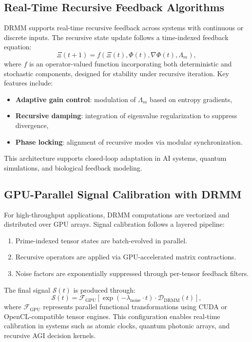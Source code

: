 \documentclass{article}
\theoremstyle{plain}
\begin{document}
\subsection{Real-Time Recursive Feedback Algorithms}

DRMM supports real-time recursive feedback across systems with continuous or discrete inputs. The recursive state update follows a time-indexed feedback equation:
\begin{equation}
\Xi(t+1) = f\left(\Xi(t), \Phi(t), \nabla \Phi(t), \Lambda_m \right),
\end{equation}
where $f$ is an operator-valued function incorporating both deterministic and stochastic components, designed for stability under recursive iteration. Key features include:
\begin{itemize}
    \item \textbf{Adaptive gain control}: modulation of $\Lambda_m$ based on entropy gradients,
    \item \textbf{Recursive damping}: integration of eigenvalue regularization to suppress divergence,
    \item \textbf{Phase locking}: alignment of recursive modes via modular synchronization.
\end{itemize}
This architecture supports closed-loop adaptation in AI systems, quantum simulations, and biological feedback modeling.

\subsection{GPU-Parallel Signal Calibration with DRMM}

For high-throughput applications, DRMM computations are vectorized and distributed over GPU arrays. Signal calibration follows a layered pipeline:
\begin{enumerate}
    \item Prime-indexed tensor states are batch-evolved in parallel.
    \item Recursive operators are applied via GPU-accelerated matrix contractions.
    \item Noise factors are exponentially suppressed through per-tensor feedback filters.
\end{enumerate}

The final signal $\mathcal{S}(t)$ is produced through:
\begin{equation}
\mathcal{S}(t) = \mathcal{F}_{\text{GPU}} \left[ \exp(-\lambda_{\text{noise}} \cdot t) \cdot \mathcal{D}_{\text{DRMM}}(t) \right],
\end{equation}
where $\mathcal{F}_{\text{GPU}}$ represents parallel functional transformations using CUDA or OpenCL-compatible tensor engines. This configuration enables real-time calibration in systems such as atomic clocks, quantum photonic arrays, and recursive AGI decision kernels.
\end{document}
